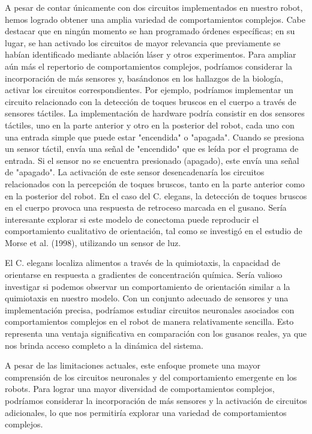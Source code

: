 A pesar de contar únicamente con dos circuitos implementados en nuestro robot, hemos logrado obtener una amplia variedad de comportamientos complejos. Cabe destacar que en ningún momento se han programado órdenes específicas; en su lugar, se han activado los circuitos de mayor relevancia que previamente se habían identificado mediante ablación láser y otros experimentos. Para ampliar aún más el repertorio de comportamientos complejos, podríamos considerar la incorporación de más sensores y, basándonos en los hallazgos de la biología, activar los circuitos correspondientes. Por ejemplo, podríamos implementar un circuito relacionado con la detección de toques bruscos en el cuerpo a través de sensores táctiles. La implementación de hardware podría consistir en dos sensores táctiles, uno en la parte anterior y otro en la posterior del robot, cada uno con una entrada simple que puede estar "encendida" o "apagada". Cuando se presiona un sensor táctil, envía una señal de "encendido" que es leída por el programa de entrada. Si el sensor no se encuentra presionado (apagado), este envía una señal de "apagado". La activación de este sensor desencadenaría los circuitos relacionados con la percepción de toques bruscos, tanto en la parte anterior como en la posterior del robot. En el caso del C. elegans, la detección de toques bruscos en el cuerpo provoca una respuesta de retroceso marcada en el gusano. Sería interesante explorar si este modelo de conectoma puede reproducir el comportamiento cualitativo de orientación, tal como se investigó en el estudio de Morse et al. (1998), utilizando un sensor de luz.

El C. elegans localiza alimentos a través de la quimiotaxis, la capacidad de orientarse en respuesta a gradientes de concentración química. Sería valioso investigar si podemos observar un comportamiento de orientación similar a la quimiotaxis en nuestro modelo. Con un conjunto adecuado de sensores y una implementación precisa, podríamos estudiar circuitos neuronales asociados con comportamientos complejos en el robot de manera relativamente sencilla. Esto representa una ventaja significativa en comparación con los gusanos reales, ya que nos brinda acceso completo a la dinámica del sistema.

A pesar de las limitaciones actuales, este enfoque promete una mayor comprensión de los circuitos neuronales y del comportamiento emergente en los robots. Para lograr una mayor diversidad de comportamientos complejos, podríamos considerar la incorporación de más sensores y la activación de circuitos adicionales, lo que nos permitiría explorar una variedad de comportamientos complejos.





